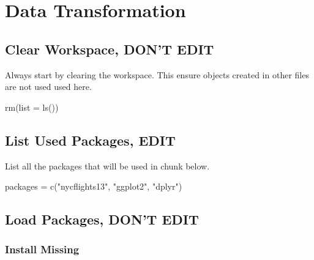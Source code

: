 \documentclass[
  letterpaper,
  DIV=11,
  numbers=noendperiod]{scrreprt}
\newenvironment{Shaded}{\begin{snugshade}}{\end{snugshade}}
\newcommand{\AttributeTok}[1]{\textcolor[rgb]{0.40,0.45,0.13}{#1}}
\newcommand{\FunctionTok}[1]{\textcolor[rgb]{0.28,0.35,0.67}{#1}}
\newcommand{\NormalTok}[1]{\textcolor[rgb]{0.00,0.23,0.31}{#1}}
\newcommand{\OtherTok}[1]{\textcolor[rgb]{0.00,0.23,0.31}{#1}}
\newcommand{\StringTok}[1]{\textcolor[rgb]{0.13,0.47,0.30}{#1}}
\begin{document}
\chapter{Data Transformation}\label{data-transformation}

\section*{Clear Workspace, DON'T
EDIT}\label{clear-workspace-dont-edit-4}


Always start by clearing the workspace. This ensure objects created in
other files are not used used here.

\begin{Shaded}
\begin{Highlighting}[]
\FunctionTok{rm}\NormalTok{(}\AttributeTok{list =} \FunctionTok{ls}\NormalTok{())}
\end{Highlighting}
\end{Shaded}

\section*{List Used Packages, EDIT}\label{list-used-packages-edit-4}


List all the packages that will be used in chunk below.

\begin{Shaded}
\begin{Highlighting}[]
\NormalTok{packages }\OtherTok{=} \FunctionTok{c}\NormalTok{(}\StringTok{"nycflights13"}\NormalTok{, }\StringTok{"ggplot2"}\NormalTok{, }\StringTok{"dplyr"}\NormalTok{)}
\end{Highlighting}
\end{Shaded}

\section*{Load Packages, DON'T EDIT}\label{sec-packages}


\subsection*{Install Missing}\label{install-missing-4}
\end{document}

